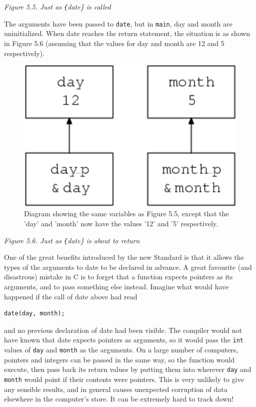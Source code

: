 \begin{center}\textit{Figure 5.5. Just as \texttt\{date\} is called}\end{center}


   The arguments have been passed to \texttt{date}, but in
    \texttt{main}, day and month are uninitialized. When date reaches
    the return statement, the situation is as shown in Figure 5.6 (assuming that the values for day and month are 12 and
    5 respectively).


   \begin{figure}\centering\includegraphics[type=pdf,read=.pdf,ext=.pdf,scale=1.0]{figure/5.6}\caption{Diagram showing the same variables as Figure 5.5, except that            the 'day' and 'month' now have the values '12' and '5'            respectively.}\end{figure}

\begin{center}\textit{Figure 5.6. Just as \texttt\{date\} is about to return}\end{center}


   One of the great benefits introduced by the new Standard is that it
    allows the types of the arguments to date to be declared in advance.
    A great favourite (and disastrous) mistake in C is to forget that
    a function expects pointers as its arguments, and to pass something else
    instead. Imagine what would have happened if the call of date above had
    read


   \begin{Verbatim}
date(day, month);
\end{Verbatim}

   and no previous declaration of date had been visible. The compiler
    would not have known that date expects pointers as arguments, so it
    would pass the \texttt{int} values of \texttt{day} and
    \texttt{month} as the arguments. On a large number of computers,
    pointers and integers can be passed in the same way, so the function
    would execute, then pass back its return values by putting them into
    wherever \texttt{day} and \texttt{month} would point if their
    contents were pointers. This is very unlikely to give any sensible
    results, and in general causes unexpected corruption of data elsewhere
    in the computer's store. It can be extremely hard to track down!


